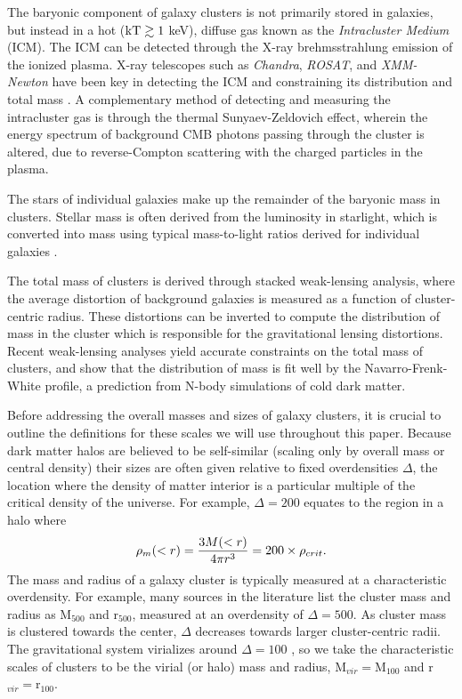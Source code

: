 The baryonic component of galaxy clusters is not primarily stored in
galaxies, but instead in a hot ($\textrm{kT} \gtrsim 1$ keV), diffuse
gas known as the \textit{Intracluster Medium} (ICM). The ICM can be
detected through the X-ray brehmsstrahlung emission of the ionized
plasma. X-ray telescopes such as \textit{Chandra}, \textit{ROSAT}, and
\textit{XMM-Newton} have been key in detecting the ICM and
constraining its distribution and total mass . A complementary method
of detecting and measuring the intracluster gas is through the thermal
Sunyaev-Zeldovich \citep[SZ,][]{Sunyaev1972} effect, wherein the
energy spectrum of background CMB photons passing through the cluster
is altered, due to reverse-Compton scattering with the charged
particles in the plasma.

The stars of individual galaxies make up the remainder of the baryonic
mass in clusters. Stellar mass is often derived from the luminosity in
starlight, which is converted into mass using typical mass-to-light
ratios derived for individual galaxies \citep{Bahcall2014}.

The total mass of clusters is derived through stacked weak-lensing
analysis, where the average distortion of background galaxies is
measured as a function of cluster-centric radius. These distortions
can be inverted to compute the distribution of mass in the cluster
which is responsible for the gravitational lensing distortions. Recent
weak-lensing analyses \citep{Mandelbaum2008, Sheldon2009} yield
accurate constraints on the total mass of clusters, and show that the
distribution of mass is fit well by the Navarro-Frenk-White
\citep[NFW,][]{Navarro1996} profile, a prediction from N-body
simulations of cold dark matter.

Before addressing the overall masses and sizes of galaxy clusters, it
is crucial to outline the definitions for these scales we will use
throughout this paper. Because dark matter halos are believed to be
self-similar (scaling only by overall mass or central density) their
sizes are often given relative to fixed overdensities $\Delta$, the
location where the density of matter interior is a particular multiple of
the critical density of the universe. For example, $\Delta = 200$
equates to the region in a halo where
\begin{equation}
\rho_m(<r) = \frac{3M(<r)}{4\pi{}r^3} = 200\times\rho_{crit}. \nonumber
\end{equation}
The mass and radius of a galaxy cluster is typically measured at a
characteristic overdensity. For example, many sources in the
literature list the cluster mass and radius as M$_{500}$ and
r$_{500}$, measured at an overdensity of $\Delta = 500$. As cluster
mass is clustered towards the center, $\Delta$ decreases towards
larger cluster-centric radii. The gravitational system virializes
around $\Delta = 100$ \citep{Eke1996}, so we take the characteristic
scales of clusters to be the virial (or halo) mass and radius,
M$_{vir} = $M$_{100}$ and r$_{vir} = $r$_{100}$.

